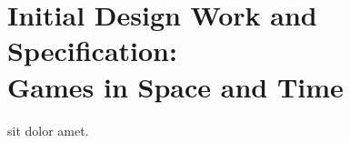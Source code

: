 \chapter[Initial Design Work and Specification]{Initial Design Work and Specification: \\Games in Space and Time}
\label{ch:specv1}


 sit dolor amet.  \lipsum[2-4]